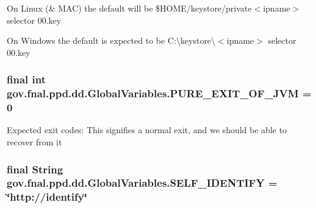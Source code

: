 On Linux (\& M\-A\-C) the default will be \$\-H\-O\-M\-E/keystore/private$<$ipname$>$ selector 00.\-key

On Windows the default is expected to be C\-:\textbackslash{}keystore\textbackslash{}$<$ipname$>$ selector 00.\-key \hypertarget{classgov_1_1fnal_1_1ppd_1_1dd_1_1GlobalVariables_a9a5a3b99227fe4929fc0c3c664a922da}{
\subsubsection[{P\-U\-R\-E\-\_\-\-E\-X\-I\-T\-\_\-\-O\-F\-\_\-\-J\-V\-M}]{\setlength{\rightskip}{0pt plus 5cm}final int gov.\-fnal.\-ppd.\-dd.\-Global\-Variables.\-P\-U\-R\-E\-\_\-\-E\-X\-I\-T\-\_\-\-O\-F\-\_\-\-J\-V\-M = 0\hspace{0.3cm}{\ttfamily [static]}}}\label{classgov_1_1fnal_1_1ppd_1_1dd_1_1GlobalVariables_a9a5a3b99227fe4929fc0c3c664a922da}
Expected exit codes\-: This signifies a normal exit, and we should be able to recover from it \hypertarget{classgov_1_1fnal_1_1ppd_1_1dd_1_1GlobalVariables_aaaf6fe49f89ce39ddba1fac773161acf}{
\subsubsection[{S\-E\-L\-F\-\_\-\-I\-D\-E\-N\-T\-I\-F\-Y}]{\setlength{\rightskip}{0pt plus 5cm}final String gov.\-fnal.\-ppd.\-dd.\-Global\-Variables.\-S\-E\-L\-F\-\_\-\-I\-D\-E\-N\-T\-I\-F\-Y = \char`\"{}http\-://identify\char`\"{}\hspace{0.3cm}{\ttfamily [static]}}}\label{classgov_1_1fnal_1_1ppd_1_1dd_1_1GlobalVariables_aaaf6fe49f89ce39ddba1fac773161acf}
